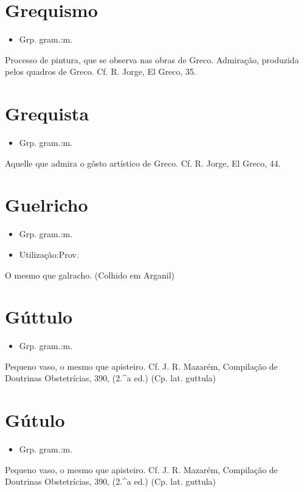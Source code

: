 \section{Grequismo}
\begin{itemize}
\item {Grp. gram.:m.}
\end{itemize}
Processo de pintura, que se observa nas obras de Greco.
Admiração, produzida pelos quadros de Greco. Cf. R. Jorge, \textunderscore El Greco\textunderscore , 35.
\section{Grequista}
\begin{itemize}
\item {Grp. gram.:m.}
\end{itemize}
Aquelle que admira o gôsto artístico de Greco. Cf. R. Jorge, \textunderscore El Greco\textunderscore , 44.
\section{Guelricho}
\begin{itemize}
\item {Grp. gram.:m.}
\end{itemize}
\begin{itemize}
\item {Utilização:Prov.}
\end{itemize}
O mesmo que \textunderscore galracho\textunderscore . (Colhido em Arganil)
\section{Gúttulo}
\begin{itemize}
\item {Grp. gram.:m.}
\end{itemize}
Pequeno vaso, o mesmo que \textunderscore apisteiro\textunderscore . Cf. J. R. Mazarém, \textunderscore Compilação de Doutrinas Obstetrícias\textunderscore , 390, (2.^a ed.)
(Cp. lat. \textunderscore guttula\textunderscore )
\section{Gútulo}
\begin{itemize}
\item {Grp. gram.:m.}
\end{itemize}
Pequeno vaso, o mesmo que \textunderscore apisteiro\textunderscore . Cf. J. R. Mazarém, \textunderscore Compilação de Doutrinas Obstetrícias\textunderscore , 390, (2.^a ed.)
(Cp. lat. \textunderscore guttula\textunderscore )

